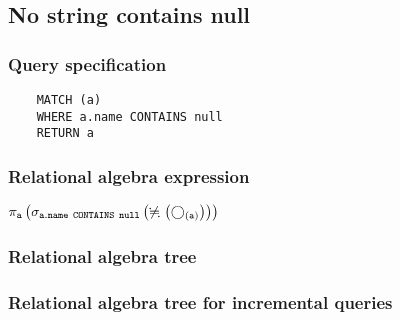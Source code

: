 	\subsection{No string contains null}

	\subsubsection*{Query specification}

	\begin{lstlisting}
	MATCH (a)
	WHERE a.name CONTAINS null
	RETURN a
	\end{lstlisting}


	\subsubsection*{Relational algebra expression}

	$\projection{\var{a}} \left(\selection{\mathtt{a.name~CONTAINS~null}} \left(\alldifferent{} \left(\getvertices{a}{}\right)\right)\right)$

	\subsubsection*{Relational algebra tree}


	\subsubsection*{Relational algebra tree for incremental queries}


